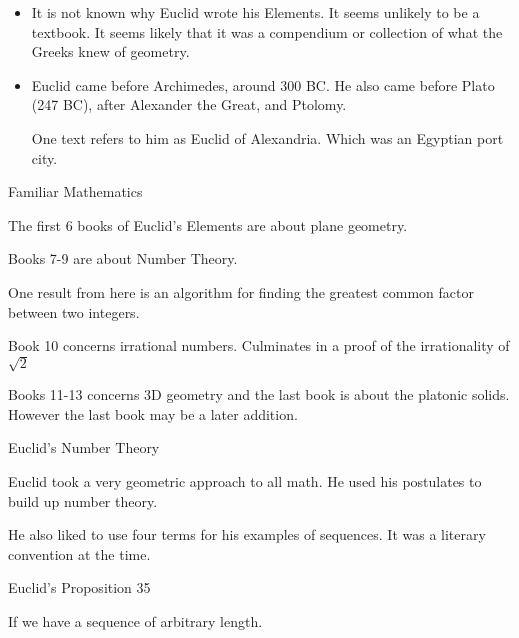 \documentclass{report}
\begin{document}
\begin{description}
\begin{mdframed}
\begin{itemize}
                \item It is not known why Euclid wrote his Elements.
                    It seems unlikely to be a textbook. It seems
                    likely that it was a compendium or collection
                    of what the Greeks knew of geometry.
                \item Euclid came before Archimedes, around
                    300 BC. He also came before Plato (247 BC),
                    after Alexander the Great, and Ptolomy.
                    \begin{mdframed}
                        One text refers to him as Euclid of
                        Alexandria. Which was an Egyptian port
                        city.
                    \end{mdframed}
            \end{itemize}
        \end{mdframed}
        \pagebreak
    \item {\large Familiar Mathematics}
        \begin{mdframed}
            The first 6 books of Euclid's Elements
            are about plane geometry.

            Books 7-9 are about Number Theory.
            \begin{mdframed}
                One result from here is an algorithm for
                finding the greatest common factor
                between two integers.
            \end{mdframed}

            Book 10 concerns irrational numbers. Culminates in
            a proof of the irrationality of $\sqrt{2}$

            Books 11-13 concerns 3D geometry and the last book
            is about the platonic solids. However the last
            book may be a later addition.
        \end{mdframed}
    \item {\large Euclid's Number Theory}
        \begin{mdframed}
            Euclid took a very geometric approach to all math.
            He used his postulates to build up number theory.

            He also liked to use four terms for his examples of
            sequences. It was a literary convention at the time.
        \end{mdframed}
        {\large Euclid's Proposition 35}
        \begin{mdframed}
            If we have a sequence of arbitrary length. 


\end{mdframed}
\end{description}
\end{document}
